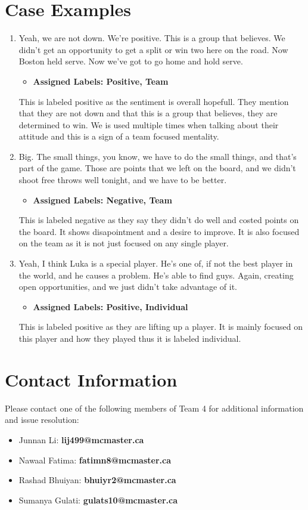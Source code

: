\documentclass[titlepage]{article}
\begin{document}
\section{Case Examples}
\begin{enumerate}
    \item Yeah, we are not down. We're positive. This is a group that believes. We didn't get an opportunity to get a 
    split or win two here on the road. Now Boston held serve. Now we've got to go home and hold serve.
    \begin{itemize}
        \item \textbf{Assigned Labels: Positive, Team}
    \end{itemize}
    This is labeled positive as the sentiment is overall hopefull. They mention that they are not down and that this is a group that believes, they are determined to win. We is used multiple times when talking about their attitude and this is a sign of a team focused mentality.

    \item Big. The small things, you know, we have to do the small things, and that's part of the game. Those are points 
    that we left on the board, and we didn't shoot free throws well tonight, and we have to be better.
    \begin{itemize}
        \item \textbf{Assigned Labels: Negative, Team}
    \end{itemize}
    This is labeled negative as they say they didn't do well and costed points on the board. It shows disapointment and a desire to improve. It is also focused on the team as it is not just focused on any single player.

    \item Yeah, I think Luka is a special player. He's one of, if not the best player in the world, and he causes a problem. 
    He's able to find guys. Again, creating open opportunities, and we just didn't take advantage of it.
    \begin{itemize}
        \item \textbf{Assigned Labels: Positive, Individual}
    \end{itemize}
    This is labeled positive as they are lifting up a player. It is mainly focused on this player and how they played thus it is labeled individual.
\end{enumerate}

\section{Contact Information}
Please contact one of the following members of Team 4 for additional information and issue resolution:
\begin{itemize}
    \item Junnan Li: \textbf{lij499@mcmaster.ca}
    \item Nawaal Fatima: \textbf{fatimn8@mcmaster.ca}
    \item Rashad Bhuiyan: \textbf{bhuiyr2@mcmaster.ca}
    \item Sumanya Gulati: \textbf{gulats10@mcmaster.ca}
\end{itemize}
\end{document}
